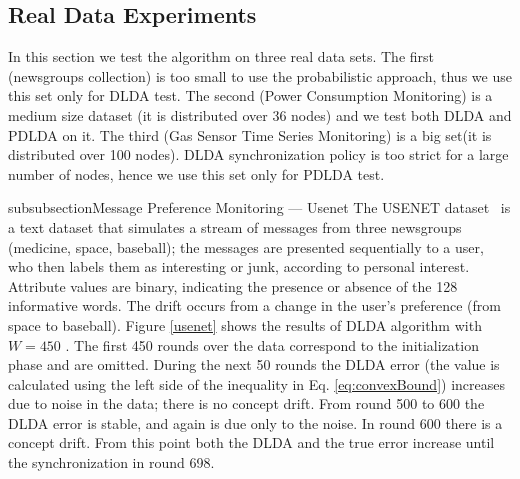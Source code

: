 \documentclass{sig-alternate-05-2015}
\begin{document}
\subsection{Real Data Experiments}
In this section we test the algorithm on three real data sets. The first
(newsgroups collection) is too small to use the probabilistic approach, thus we use this set only for DLDA test.
The second (Power Consumption Monitoring) is a medium size dataset (it
is distributed over 36 nodes) and we test both DLDA and PDLDA on it.
The third (Gas Sensor Time Series Monitoring) is a big set(it is distributed over
100 nodes). DLDA synchronization policy is too strict for a large number of nodes, hence we use this set only for PDLDA test.

subsubsection{Message Preference Monitoring --- Usenet}
The USENET dataset~\cite{usenet} is a text dataset that simulates a stream of messages from three newsgroups (medicine, space, baseball); the messages are presented sequentially to a user, who then labels them as interesting or junk, according to personal interest. Attribute values are binary, indicating the presence or absence of the 128 informative words. The drift occurs from a change in the user's
preference (from space to baseball). Figure \ref{usenet} shows the results of
DLDA algorithm with $W=450$ . The first 450 rounds over the data correspond to
the initialization phase and are omitted. During the next 50 rounds the DLDA error
(the value is calculated using the left side of the inequality in Eq.
\ref{eq:convexBound}) increases due to noise in the data; there is
no concept drift. From round 500 to 600 the DLDA error is stable,
and again is due only to the noise. In round 600 there is a concept
drift.
From this point both the DLDA and the true error increase until the
synchronization in round 698.










	
\end{document}
